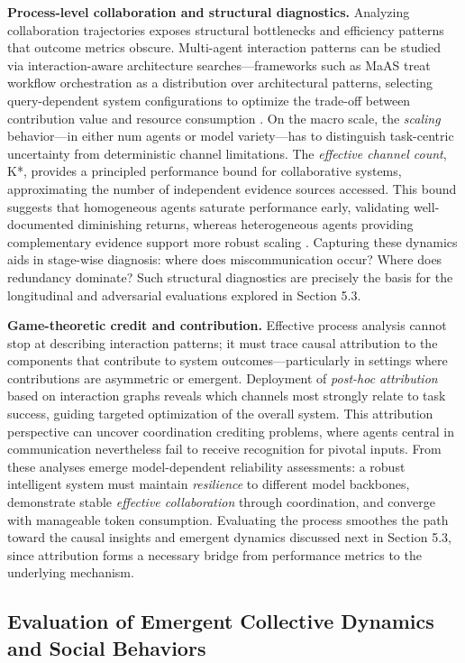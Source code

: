 \documentclass[11pt,a4paper]{article}
\begin{document}
\textbf{Process-level collaboration and structural diagnostics.} Analyzing collaboration trajectories exposes structural bottlenecks and efficiency patterns that outcome metrics obscure. Multi-agent interaction patterns can be studied via interaction-aware architecture searches---frameworks such as MaAS treat workflow orchestration as a distribution over architectural patterns, selecting query-dependent system configurations to optimize the trade-off between contribution value and resource consumption \cite{arxiv:2502.04180v2}. On the macro scale, the \emph{scaling} behavior---in either num agents or model variety---has to distinguish task-centric uncertainty from deterministic channel limitations. The \emph{effective channel count}, K*, provides a principled performance bound for collaborative systems, approximating the number of independent evidence sources accessed. This bound suggests that homogeneous agents saturate performance early, validating well-documented diminishing returns, whereas heterogeneous agents providing complementary evidence support more robust scaling \cite{arxiv:2602.03794v1}. Capturing these dynamics aids in stage-wise diagnosis: where does miscommunication occur? Where does redundancy dominate? Such structural diagnostics are precisely the basis for the longitudinal and adversarial evaluations explored in Section 5.3.

\textbf{Game-theoretic credit and contribution.} Effective process analysis cannot stop at describing interaction patterns; it must trace causal attribution to the components that contribute to system outcomes---particularly in settings where contributions are asymmetric or emergent. Deployment of \emph{post-hoc attribution} based on interaction graphs reveals which channels most strongly relate to task success, guiding targeted optimization of the overall system. This attribution perspective can uncover coordination crediting problems, where agents central in communication nevertheless fail to receive recognition for pivotal inputs. From these analyses emerge model-dependent reliability assessments: a robust intelligent system must maintain \emph{resilience} to different model backbones, demonstrate stable \emph{effective collaboration} through coordination, and converge with manageable token consumption. Evaluating the process smoothes the path toward the causal insights and emergent dynamics discussed next in Section 5.3, since attribution forms a necessary bridge from performance metrics to the underlying mechanism.


\subsection{Evaluation of Emergent Collective Dynamics and Social Behaviors}
\end{document}
